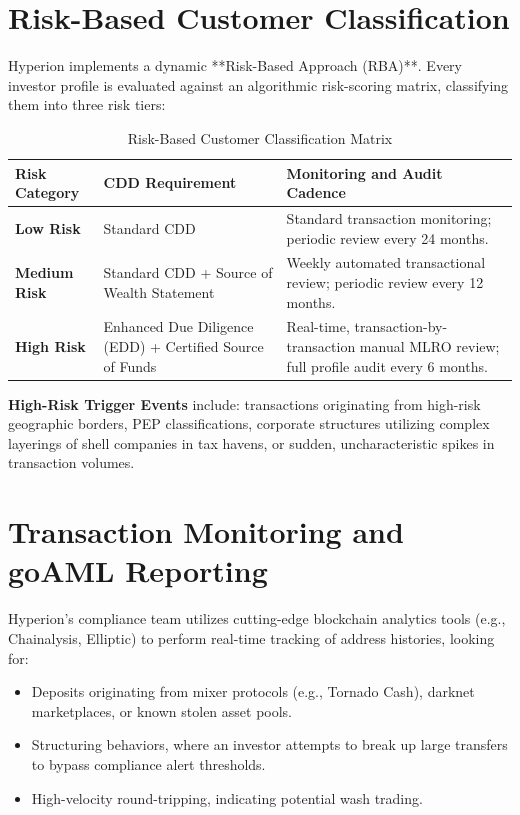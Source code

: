 \documentclass[11pt]{article}
\begin{document}
\section{Risk-Based Customer Classification}
Hyperion implements a dynamic **Risk-Based Approach (RBA)**. Every investor profile is evaluated against an algorithmic risk-scoring matrix, classifying them into three risk tiers:
\begin{table}[h!]
\centering
\begin{tabularx}{\textwidth}{l l X}
\toprule
\textbf{Risk Category} & \textbf{CDD Requirement} & \textbf{Monitoring and Audit Cadence} \\
\midrule
\textbf{Low Risk} & Standard CDD & Standard transaction monitoring; periodic review every 24 months. \\
\textbf{Medium Risk} & Standard CDD + Source of Wealth Statement & Weekly automated transactional review; periodic review every 12 months. \\
\textbf{High Risk} & Enhanced Due Diligence (EDD) + Certified Source of Funds & Real-time, transaction-by-transaction manual MLRO review; full profile audit every 6 months. \\
\bottomrule
\end{tabularx}
\caption{Risk-Based Customer Classification Matrix}
\end{table}

\textbf{High-Risk Trigger Events} include: transactions originating from high-risk geographic borders, PEP classifications, corporate structures utilizing complex layerings of shell companies in tax havens, or sudden, uncharacteristic spikes in transaction volumes.

\section{Transaction Monitoring and goAML Reporting}
Hyperion's compliance team utilizes cutting-edge blockchain analytics tools (e.g., Chainalysis, Elliptic) to perform real-time tracking of address histories, looking for:
\begin{itemize}
    \item Deposits originating from mixer protocols (e.g., Tornado Cash), darknet marketplaces, or known stolen asset pools.
    \item Structuring behaviors, where an investor attempts to break up large transfers to bypass compliance alert thresholds.
    \item High-velocity round-tripping, indicating potential wash trading.
\end{itemize}
\end{document}
